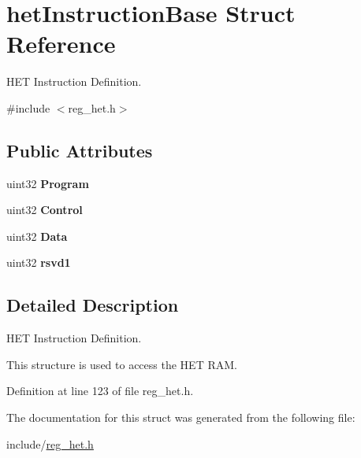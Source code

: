 \hypertarget{structhetInstructionBase}{}\section{het\+Instruction\+Base Struct Reference}
\label{structhetInstructionBase}


H\+ET Instruction Definition.  




{\ttfamily \#include $<$reg\+\_\+het.\+h$>$}

\subsection*{Public Attributes}
\begin{DoxyCompactItemize}
\item 
\mbox{\label{structhetInstructionBase_a487550fc487432014a2755499a6b6244}} 
uint32 {\bfseries Program}
\item 
\mbox{\label{structhetInstructionBase_ac195d982b47f62293d29c27c82da6f12}} 
uint32 {\bfseries Control}
\item 
\mbox{\label{structhetInstructionBase_afe69d195a42de7795c0eacd0a80531d5}} 
uint32 {\bfseries Data}
\item 
\mbox{\label{structhetInstructionBase_a05bab050935d41099ee0228bfd243c94}} 
uint32 {\bfseries rsvd1}
\end{DoxyCompactItemize}


\subsection{Detailed Description}
H\+ET Instruction Definition. 

This structure is used to access the H\+ET R\+AM. 

Definition at line 123 of file reg\+\_\+het.\+h.



The documentation for this struct was generated from the following file\+:\begin{DoxyCompactItemize}
\item 
include/\mbox{\hyperlink{reg__het_8h}{reg\+\_\+het.\+h}}\end{DoxyCompactItemize}
